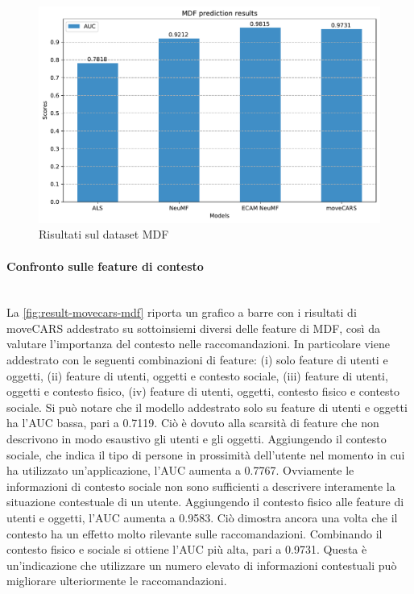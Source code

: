 \documentclass[12pt,italian]{report}
\newcommand{\myparagraph}[1]{\paragraph{#1}\mbox{}\\} %
\begin{document}
\begin{figure}
  \centering
  \includegraphics[width=\linewidth]{immagini/mdf_test_results.pdf}
  \caption{Risultati sul dataset MDF}
  \label{fig:result-mdf}
\end{figure}

\myparagraph{Confronto sulle feature di contesto}
La \autoref{fig:result-movecars-mdf} riporta un grafico a barre con i risultati di moveCARS addestrato su sottoinsiemi diversi delle feature di MDF, così da valutare l'importanza del contesto nelle raccomandazioni. In particolare viene addestrato con le seguenti combinazioni di feature: (i) solo feature di utenti e oggetti, (ii) feature di utenti, oggetti e contesto sociale, (iii) feature di utenti, oggetti e contesto fisico, (iv) feature di utenti, oggetti, contesto fisico e contesto sociale. Si può notare che il modello addestrato solo su feature di utenti e oggetti ha l'AUC bassa, pari a 0.7119. Ciò è dovuto alla scarsità di feature che non descrivono in modo esaustivo gli utenti e gli oggetti. Aggiungendo il contesto sociale, che indica il tipo di persone in prossimità dell'utente nel momento in cui ha utilizzato un'applicazione, l'AUC aumenta a 0.7767. Ovviamente le informazioni di contesto sociale non sono sufficienti a descrivere interamente la situazione contestuale di un utente. Aggiungendo il contesto fisico alle feature di utenti e oggetti, l'AUC aumenta a 0.9583. Ciò dimostra ancora una volta che il contesto ha un effetto molto rilevante sulle raccomandazioni. Combinando il contesto fisico e sociale si ottiene l'AUC più alta, pari a 0.9731. Questa è un'indicazione che utilizzare un numero elevato di informazioni contestuali può migliorare ulteriormente le raccomandazioni.
\end{document}
